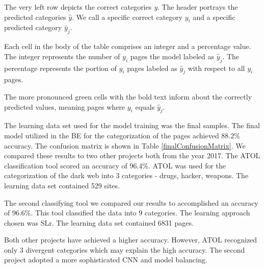 \begin{table}
{The very left row depicts the correct categories \textit{y}. The header portrays the predicted categories $\hat{y}$. We call a specific correct category $y_i$ and a specific predicted category $\hat{y}_j$. 

Each cell in the body of the table comprises an integer and a percentage value. The integer represents the number of  $y_i$ pages the model labeled as $\hat{y}_j$. The percentage represents the portion of ${y_i}$ pages labeled as $\hat{y}_j$ with respect to all ${y_i}$ pages. 

The more pronounced green cells with the bold text inform about the correctly predicted values, meaning pages where $y_i$ equals $\hat{y}_j$.}
\label{finalConfusionMatrix}
\end{table}

The learning data set used for the model training was the final samples. The final model utilized in the BE for the categorization of the pages achieved 88.2\% accuracy. The confusion matrix is shown in Table \ref{finalConfusionMatrix}. We compared these results to two other projects both from the year 2017. The ATOL \cite{atol} classification tool scored an accuracy of 96.4\%. ATOL was used for the categorization of the dark web into 3 categories - drugs, hacker, weapons. The learning data set contained 529 sites. 

The second classifying tool \cite{classificationProject} we compared our results to accomplished an accuracy of 96.6\%. This tool classified the data into 9 categories. The learning approach chosen was SLr. The learning data set contained 6831 pages. 

Both other projects have achieved a higher accuracy. However, ATOL recognized only 3 divergent categories which may explain the high accuracy. The second project adopted a more sophisticated CNN and model balancing. 

